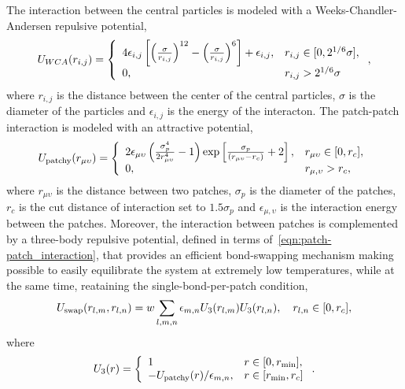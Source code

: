 \documentclass[../main.tex]{subfiles}
\begin{document}
The interaction between the central particles is modeled with a Weeks-Chandler-Andersen repulsive potential,
\begin{gather}
    U_{WCA}(r_{i,j}) =\left\{ 
        \begin{array}{ll}
            4\epsilon_{i,j}\left[\qty(\frac{\sigma}{r_{i,j}})^{12}-\qty(\frac{\sigma}{r_{i,j}})^6\right]+\epsilon_{i,j}, & r_{i,j}\in[0,2^{1/6}\sigma], \\
            0, & r_{i,j}>2^{1/6}\sigma
        \end{array}
\right.
    ,\label{eqn:CL-MO_interaction}
\end{gather}
where $r_{i,j}$ is the distance between the center of the central particles, $\sigma$ is the diameter of the particles and $\epsilon_{i,j}$ is the energy of the interacton.
The patch-patch interaction is modeled with an attractive potential,
\begin{gather}
    U_{\mathrm{patchy}}\qty(r_{\mu\upsilon}) = \left\{
        \begin{array}{ll}
            2\epsilon_{\mu\upsilon}\left(\frac{\sigma_p^4}{2 r_{\mu\upsilon}^4}-1\right)\exp\left[\frac{\sigma_p}{\qty(r_{\mu\upsilon}-r_{c})}+2\right], & r_{\mu\upsilon}\in\qty[0,r_c], \\
            0, & r_{\mu,\upsilon}>r_c,
        \end{array}
            \right.\label{eqn:patch-patch_interaction}
\end{gather}
where $r_{\mu\upsilon}$ is the distance between two patches, $\sigma_p$ is the diameter of the patches, $r_c$ is the cut distance of interaction set to $1.5\sigma_p$ and $\epsilon_{\mu,\upsilon}$ is the interaction energy between the patches.
Moreover, the interaction between patches is complemented by a three-body repulsive potential, defined in terms of~\eqref{eqn:patch-patch_interaction}, that provides an efficient bond-swapping mechanism making possible to easily equilibrate the system at extremely low temperatures, while at the same time, reataining the single-bond-per-patch condition\citep{sciortinoThreebodyPotentialSimulating2017},
\begin{gather}
    U_{\mathrm{swap}}(r_{l,m},r_{l,n}) = w\sum_{l,m,n}\epsilon_{m,n}U_3\qty(r_{l,m})U_3\qty(r_{l,n}),\quad r_{l,n}\in\qty[0,r_c],\label{eqn:swap_interaction}
\end{gather}
where
\begin{gather}
    U_{3}\qty(r) = \left\{
        \begin{array}{ll}
            1 & r\in\qty[0,r_{\min}], \\
            -U_{\mathrm{patchy}}\qty(r)/\epsilon_{m,n}, & r\in\qty[r_{\min},r_c]
        \end{array}
        \right.\label{eqn:swapmod_interaction}.
\end{gather}
\end{document}
